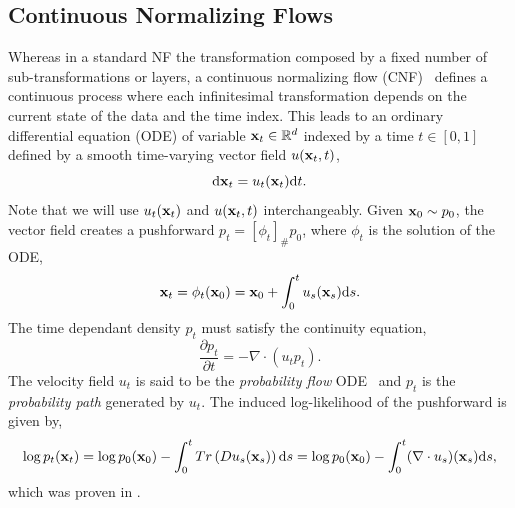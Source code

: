 \subsection{Continuous Normalizing Flows}


Whereas in a standard NF the transformation composed by a fixed number of sub-transformations or layers, a continuous normalizing flow (CNF)~\cite{NeuralODE} defines a continuous process where each infinitesimal transformation depends on the current state of the data and the time index.
This leads to an ordinary differential equation (ODE) of variable $\mathbf{x}_t \in \mathbb{R}^d$ indexed by a time $t \in [0, 1]$ defined by a smooth time-varying vector field $u(\mathbf{x}_t, t)$,
\begin{equation}
    \label{eq:cnf}
    \mathrm{d} \mathbf{x}_t = u_t(\mathbf{x}_t) \mathrm{d} t.
\end{equation}
Note that we will use $u_t(\mathbf{x}_t)$ and $u(\mathbf{x}_t, t)$ interchangeably.
Given $\mathbf{x}_0 \sim p_0$, the vector field creates a pushforward $p_t = [\phi_t]_\# p_0$, where $\phi_t$ is the solution of the ODE,
\begin{equation}
    \label{eq:cnf_pushforward}
    \mathbf{x}_t = \phi_t(\mathbf{x}_0) = \mathbf{x}_0 + \int_0^t u_s(\mathbf{x}_s) \mathrm{d} s.
\end{equation}
The time dependant density $p_t$ must satisfy the continuity equation,
\begin{equation}
    \label{eq:cnf_continuity}
    \frac{\partial p_t}{\partial t} = -\nabla \cdot (u_t p_t).
\end{equation}
The velocity field $u_t$ is said to be the \textit{probability flow} ODE~\cite{ScoreBasedGenerativeModeling} and $p_t$ is the \textit{probability path} generated by $u_t$.
The induced log-likelihood of the pushforward is given by,
\begin{equation}
    \label{eq:cnf_loglikelihood}
        \log p_t(\mathbf{x}_t)
    = \log p_0(\mathbf{x}_0) - \int_0^t Tr\left(D u_s(\mathbf{x}_s)\right)\mathrm{d} s
    = \log p_0(\mathbf{x}_0) - \int_0^t (\nabla \cdot u_s)(\mathbf{x}_s) \mathrm{d} s,
\end{equation}
which was proven in \textcite{NeuralODE}.


